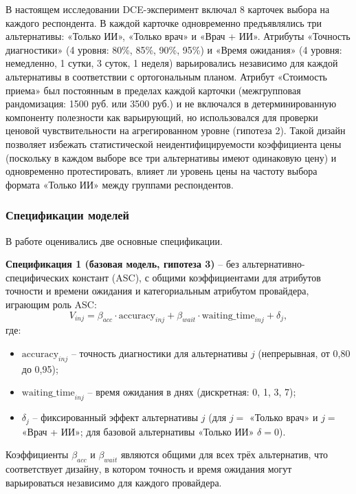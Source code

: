 \documentclass[12pt, a4paper]{article}
\begin{document}
В настоящем исследовании DCE-эксперимент включал 8 карточек выбора на каждого респондента. В каждой карточке одновременно предъявлялись три альтернативы: «Только ИИ», «Только врач» и «Врач + ИИ». Атрибуты «Точность диагностики» (4 уровня: 80\%, 85\%, 90\%, 95\%) и «Время ожидания» (4 уровня: немедленно, 1 сутки, 3 суток, 1 неделя) варьировались независимо для каждой альтернативы в соответствии с ортогональным планом. Атрибут «Стоимость приема» был постоянным в пределах каждой карточки (межгрупповая рандомизация: 1500 руб. или 3500 руб.) и не включался в детерминированную компоненту полезности как варьирующий, но использовался для проверки ценовой чувствительности на агрегированном уровне (гипотеза 2). Такой дизайн позволяет избежать статистической неидентифицируемости коэффициента цены (поскольку в каждом выборе все три альтернативы имеют одинаковую цену) и одновременно протестировать, влияет ли уровень цены на частоту выбора формата «Только ИИ» между группами респондентов.

\subsubsection{Спецификации моделей}
В работе оценивались две основные спецификации.

\textbf{Спецификация 1 (базовая модель, гипотеза 3)} -- без альтернативно-специфических констант (ASC), с общими коэффициентами для атрибутов точности и времени ожидания и категориальным атрибутом провайдера, играющим роль ASC:
\[
V_{inj} = \beta_{acc} \cdot \text{accuracy}_{inj} + \beta_{wait} \cdot \text{waiting\_time}_{inj} + \delta_j,
\]
где:
\begin{itemize}
    \item $\text{accuracy}_{inj}$ -- точность диагностики для альтернативы $j$ (непрерывная, от 0,80 до 0,95);
    \item $\text{waiting\_time}_{inj}$ -- время ожидания в днях (дискретная: 0, 1, 3, 7);
    \item $\delta_j$ -- фиксированный эффект альтернативы $j$ (для $j =$ «Только врач» и $j =$ «Врач + ИИ»; для базовой альтернативы «Только ИИ» $\delta = 0$).
\end{itemize}
Коэффициенты $\beta_{acc}$ и $\beta_{wait}$ являются общими для всех трёх альтернатив, что соответствует дизайну, в котором точность и время ожидания могут варьироваться независимо для каждого провайдера.
\end{document}
